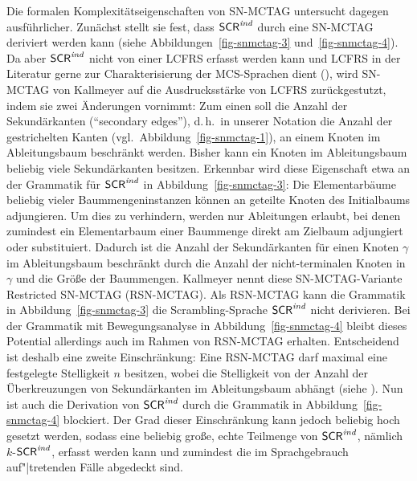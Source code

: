 Die formalen Komplexitätseigenschaften von SN-MCTAG untersucht \cite{Kallmeyer:05} dagegen ausführlicher. Zunächst stellt sie fest, dass $\mathsf{SCR}^{\mathit{ind}}$ durch eine SN-MCTAG deriviert werden kann (siehe Abbildungen~\ref{fig-snmctag-3} und~\ref{fig-snmctag-4}). Da aber $\mathsf{SCR}^{\mathit{ind}}$ nicht von einer LCFRS erfasst werden kann \citep{Becker:Rambow:Niv:92} und LCFRS in der Literatur gerne zur Charakterisierung der MCS-Sprachen dient (\citealt{Kallmeyer:10b}), wird SN-MCTAG von Kallmeyer auf die Ausdrucksstärke von LCFRS zurückgestutzt, indem sie zwei Änderungen vornimmt: Zum einen soll die Anzahl der Sekundärkanten ("`secondary edges"'), d.\,h.\ in unserer Notation die Anzahl der gestrichelten Kanten (vgl.\ Abbildung~\ref{fig-snmctag-1}), an einem Knoten im Ableitungsbaum beschränkt werden. Bisher kann ein Knoten im Ableitungsbaum beliebig viele Sekundärkanten besitzen. Erkennbar wird diese Eigenschaft etwa an der Grammatik für $\mathsf{SCR}^{\mathit{ind}}$ in Abbildung~\ref{fig-snmctag-3}: Die Elementarbäume beliebig vieler Baummengeninstanzen können an geteilte Knoten des Initialbaums adjungieren. Um dies zu verhindern, werden nur Ableitungen erlaubt, bei denen zumindest ein Elementarbaum einer Baummenge direkt am Zielbaum adjungiert oder substituiert. Dadurch ist die Anzahl der Sekundärkanten für einen Knoten $\gamma$ im Ableitungsbaum beschränkt durch die Anzahl der nicht-terminalen Knoten in $\gamma$ und die Grö\ss e der Baummengen. Kallmeyer nennt diese SN-MCTAG-Variante Restricted SN-MCTAG (RSN-MCTAG). Als RSN-MCTAG  kann die Grammatik in Abbildung~\ref{fig-snmctag-3} die Scrambling-Sprache $\mathsf{SCR}^{\mathit{ind}}$ nicht derivieren. Bei der Grammatik mit Bewegungsanalyse in Abbildung~\ref{fig-snmctag-4} bleibt dieses Potential allerdings auch im Rahmen von RSN-MCTAG erhalten. Entscheidend ist deshalb eine zweite Einschränkung: Eine RSN-MCTAG darf maximal eine festgelegte Stelligkeit $n$ besitzen, wobei die Stelligkeit von der Anzahl der Überkreuzungen von Sekundärkanten im Ableitungsbaum abhängt (siehe \citealt[212f]{Kallmeyer:05}). Nun ist auch die Derivation von $\mathsf{SCR}^{\mathit{ind}}$ durch die Grammatik in Abbildung~\ref{fig-snmctag-4} blockiert. Der Grad dieser Einschränkung kann jedoch beliebig hoch gesetzt werden, sodass eine beliebig gro\ss e, echte Teilmenge von $\mathsf{SCR}^{\mathit{ind}}$, nämlich $k$-$\mathsf{SCR}^{\mathit{ind}}$, erfasst werden kann und zumindest die im Sprachgebrauch auf"|tretenden Fälle abgedeckt sind. %

